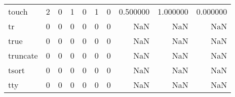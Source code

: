 \begin{tabular}{lrrrrrrrrr}
touch     &                                                  2 &                                                  0 &                                                  1 &                                                  0 &                                                  1 &                                                  0 &                                           0.500000 &                               1.000000 &                             0.000000 \\
tr        &                                                  0 &                                                  0 &                                                  0 &                                                  0 &                                                  0 &                                                  0 &                                                NaN &                                    NaN &                                  NaN \\
true      &                                                  0 &                                                  0 &                                                  0 &                                                  0 &                                                  0 &                                                  0 &                                                NaN &                                    NaN &                                  NaN \\
truncate  &                                                  0 &                                                  0 &                                                  0 &                                                  0 &                                                  0 &                                                  0 &                                                NaN &                                    NaN &                                  NaN \\
tsort     &                                                  0 &                                                  0 &                                                  0 &                                                  0 &                                                  0 &                                                  0 &                                                NaN &                                    NaN &                                  NaN \\
tty       &                                                  0 &                                                  0 &                                                  0 &                                                  0 &                                                  0 &                                                  0 &                                                NaN &                                    NaN &                                  NaN \\

\end{tabular}
